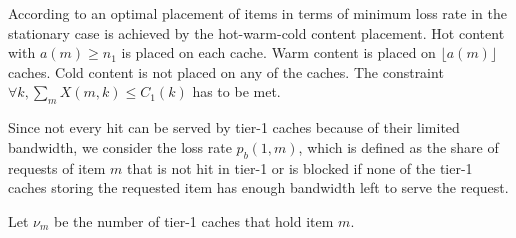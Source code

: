 According to \cite{valancius2009greening} an optimal placement of items in terms of minimum loss rate in the stationary case is achieved by the hot-warm-cold content placement.
Hot content with $a(m)\geq n_1$ is placed on each cache.
Warm content is placed on $\lfloor a(m) \rfloor$ caches.
Cold content is not placed on any of the caches.
The constraint  $\forall k, \sum_m X(m,k)\leq C_1(k)$ has to be met.

%




%

Since not every hit can be served by tier-1 caches because of their limited bandwidth, we consider the loss rate $p_{b}(1,m)$, which is defined as the share of requests of item $m$ that is not hit in tier-1 or is blocked if none of the tier-1 caches storing the requested item has enough bandwidth left to serve the request.

Let $\nu_m$ be the number of tier-1 caches that hold item $m$.

